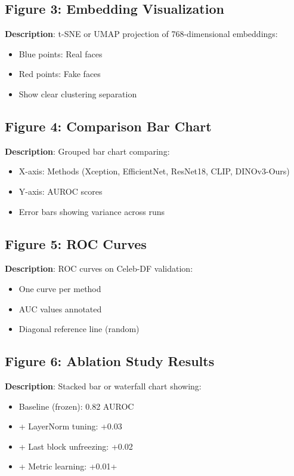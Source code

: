 \documentclass[11pt,a4paper]{article}
\begin{document}
\subsection{Figure 3: Embedding Visualization}
\textbf{Description}: t-SNE or UMAP projection of 768-dimensional embeddings:
\begin{itemize}
    \item Blue points: Real faces
    \item Red points: Fake faces
    \item Show clear clustering separation
\end{itemize}

\subsection{Figure 4: Comparison Bar Chart}
\textbf{Description}: Grouped bar chart comparing:
\begin{itemize}
    \item X-axis: Methods (Xception, EfficientNet, ResNet18, CLIP, DINOv3-Ours)
    \item Y-axis: AUROC scores
    \item Error bars showing variance across runs
\end{itemize}

\subsection{Figure 5: ROC Curves}
\textbf{Description}: ROC curves on Celeb-DF validation:
\begin{itemize}
    \item One curve per method
    \item AUC values annotated
    \item Diagonal reference line (random)
\end{itemize}

\subsection{Figure 6: Ablation Study Results}
\textbf{Description}: Stacked bar or waterfall chart showing:
\begin{itemize}
    \item Baseline (frozen): 0.82 AUROC
    \item + LayerNorm tuning: +0.03
    \item + Last block unfreezing: +0.02
    \item + Metric learning: +0.01+
\end{itemize}
\end{document}
